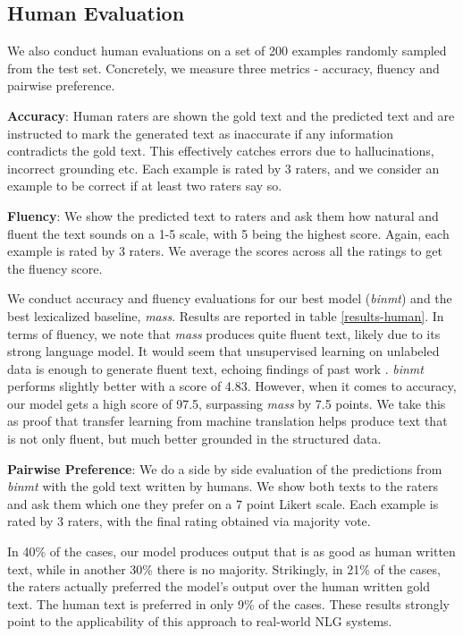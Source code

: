 \documentclass[11pt,a4paper]{article}
\begin{document}
\subsection{Human Evaluation}
We also conduct human evaluations on a set of 200 examples randomly sampled from the test set. Concretely, we measure three metrics - accuracy, fluency and pairwise preference. \par 
\textbf{Accuracy}: Human raters are shown the gold text and the predicted text and are instructed to mark the generated text as inaccurate if any information contradicts the gold text. This effectively catches errors due to hallucinations, incorrect grounding etc. Each example is rated by 3 raters, and we consider an example to be correct if at least two raters say so. \par
\textbf{Fluency}: We show the predicted text to raters and ask them how natural and fluent the text sounds on a 1-5 scale, with 5 being the highest score. Again, each example is rated by 3 raters. We average the scores across all the ratings to get the fluency score. \par
We conduct accuracy and fluency evaluations for our best model (\textsl{binmt}) and the best lexicalized baseline, \textsl{mass}. 
Results are reported in table \ref{results-human}. In terms of fluency, we note that \textsl{mass} produces quite fluent text, likely due to its strong language model. It would seem that unsupervised learning on unlabeled data is enough to generate fluent text, echoing findings of past work \citep{radford2019language}. \textsl{binmt} performs slightly better with a score of 4.83. However, when it comes to accuracy, our model gets a high score of 97.5, surpassing \textsl{mass} by 7.5 points. We take this as proof that transfer learning from machine translation helps produce text that is not only fluent, but much better grounded in the structured data. \par 
\textbf{Pairwise Preference}: We do a side by side evaluation of the predictions from \textsl{binmt} with the gold text written by humans. We show both texts to the raters and ask them which one they prefer on a 7 point Likert scale.
Each example is rated by 3 raters, with the final rating obtained via majority vote. \par 
In 40\% of the cases, our model produces output that is as good as human written text, while in another 30\% there is no majority. Strikingly, in 21\% of the cases, the raters actually preferred the model's output over the human written gold text. The human text is preferred in only 9\% of the cases. These results strongly point to the applicability of this approach to real-world NLG systems.
\end{document}
